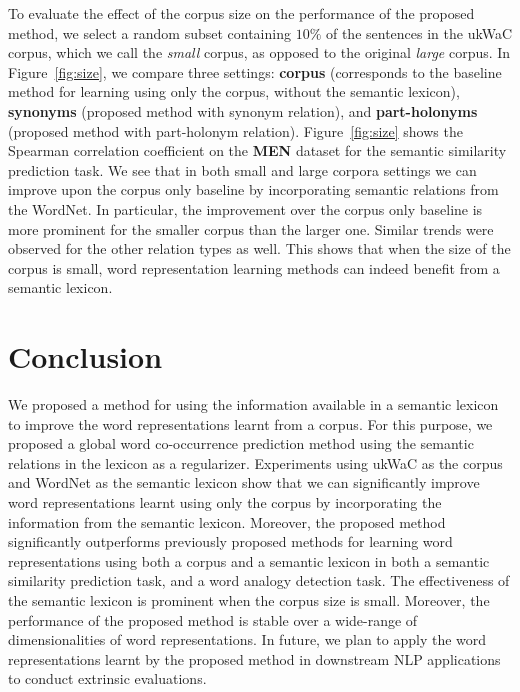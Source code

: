 \documentclass[letterpaper]{article}
\begin{document}
To evaluate the effect of the corpus size on the performance of the proposed method, we select a random
subset containing $10\%$ of the sentences in the ukWaC corpus, which we call the \emph{small} corpus, as opposed to
the original \emph{large} corpus. In Figure~\ref{fig:size}, we compare three settings:
\textbf{corpus} (corresponds to the baseline method for learning using only the corpus, without the semantic lexicon),
\textbf{synonyms} (proposed method with synonym relation), and \textbf{part-holonyms} (proposed method with part-holonym
relation). Figure~\ref{fig:size} shows the Spearman correlation coefficient on the \textbf{MEN} dataset for the semantic similarity
prediction task. We see that in both small and large corpora settings we can improve upon the corpus only baseline
by incorporating semantic relations from the WordNet. In particular, the improvement over the corpus only baseline is
more prominent for the smaller corpus than the larger one. Similar trends were observed for the other relation types as well.
This shows that when the size of the corpus is small, word representation learning methods
can indeed benefit from a semantic lexicon.


\section{Conclusion}

We proposed a method for using the information available in a semantic lexicon to improve the word representations
learnt from a corpus. For this purpose, we proposed a global word co-occurrence prediction method using the semantic relations
in the lexicon as a regularizer. Experiments using ukWaC as the corpus and WordNet as the semantic lexicon show that
we can significantly improve word representations learnt using only the corpus by incorporating the information from the semantic lexicon.
Moreover, the proposed method significantly outperforms previously proposed methods for learning word representations
using both a corpus and a semantic lexicon in both a semantic similarity prediction task, and a word analogy detection task.
The effectiveness of the semantic lexicon is prominent when the corpus size is small. Moreover, the performance
of the proposed method is stable over a wide-range of dimensionalities of word representations.
In future, we plan to apply the word representations learnt by the proposed method in downstream NLP applications
to conduct extrinsic evaluations.




\end{document}
